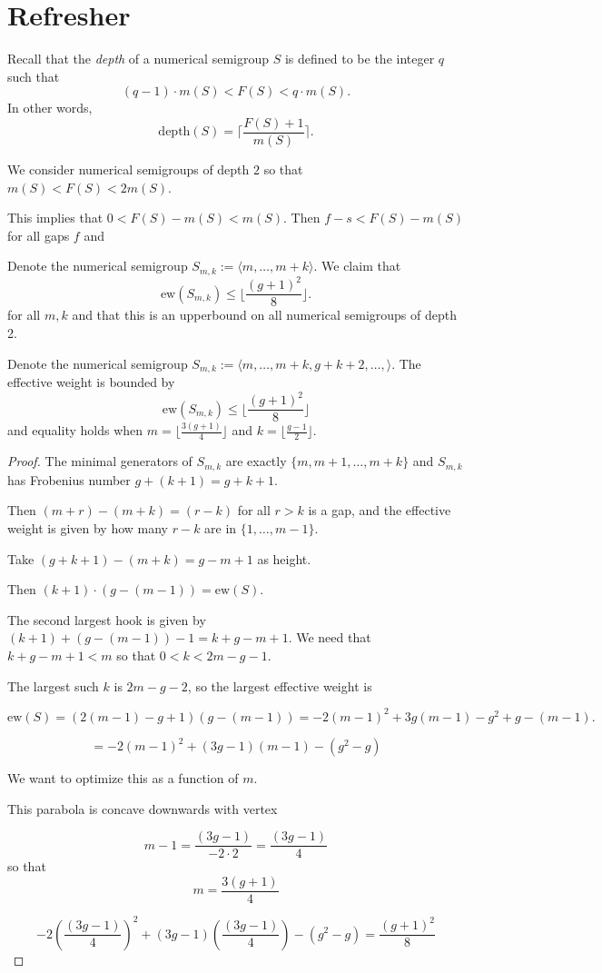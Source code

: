 \documentclass[11pt]{article}
\title{}
\author{Erik Imathiu-Jones}
\begin{document}
\maketitle

\section{Refresher}

Recall that the \emph{depth} of a numerical semigroup \(S\) is defined to be the integer \(q\) such that \[(q - 1) \cdot m(S) < F(S) < q \cdot m(S).\] In other words, \[\text{depth}(S) = \lceil \frac{F(S)+1}{m(S)} \rceil.\]

We consider numerical semigroups of depth \(2\) so that \(m(S) < F(S) < 2 m(S)\).

This implies that \(0 < F(S) - m(S) < m(S)\). Then \(f - s < F(S) - m(S)\) for all gaps \(f\) and 

Denote the numerical semigroup \(S_{m, k} := \langle m, \dots, m + k\rangle\). We claim that \[\text{ew}(S_{m, k}) \le \lfloor \frac{(g+1)^2}{8} \rfloor.\] for all \(m,k\) and that this is an upperbound on all numerical semigroups of depth 2.

\begin{lemma}
    Denote the numerical semigroup \(S_{m, k} := \langle m, \dots, m + k, g + k + 2, \dots, \rangle\). The effective weight is bounded by \[\text{ew}(S_{m, k}) \le \lfloor \frac{(g+1)^2}{8} \rfloor\] and equality holds when \(m = \lfloor \frac{3(g+1)}{4} \rfloor\) and \(k = \lfloor \frac{g-1}{2} \rfloor\).
\end{lemma}
\begin{proof}
    The minimal generators of \(S_{m, k}\) are exactly \(\{m, m + 1, \dots, m + k\}\) and \(S_{m, k}\) has Frobenius number \(g + (k + 1) = g + k + 1\). 

Then \((m + r) - (m + k) = (r - k)\) for all \(r > k\) is a gap, and the effective weight is given by how many \(r - k\) are in \(\{1, \dots, m - 1\}\).

Take \((g + k + 1) - (m + k) = g - m + 1\) as height.

Then \((k + 1) \cdot (g - (m - 1)) = \text{ew}(S)\).

The second largest hook is given by \((k + 1) + (g - (m - 1)) - 1 = k + g - m + 1\). We need that
\(k + g - m + 1 < m\) so that \(0 < k < 2m - g - 1\).

The largest such \(k\) is \(2m - g - 2\), so the largest effective weight is

\[
\text{ew}(S) = (2(m - 1) - g + 1)(g - (m - 1)) = -2(m-1)^2 + 3g(m - 1) - g^2 + g - (m-1).
\]

\[
= -2(m-1)^2 + (3g - 1)(m-1) - (g^2 - g)
\]

We want to optimize this as a function of \(m\).

This parabola is concave downwards with vertex

\[m - 1 = \frac{(3g-1)}{-2 \cdot 2} = \frac{(3g-1)}{4}\] so that \[m = \frac{3(g + 1)}{4}\]

\[
-2\left(\frac{(3g-1)}{4}\right)^2 + (3g-1)\left(\frac{(3g-1)}{4}\right) - (g^2 - g) = \frac{(g+1)^2}{8}
\]
\end{proof}
\end{document}
